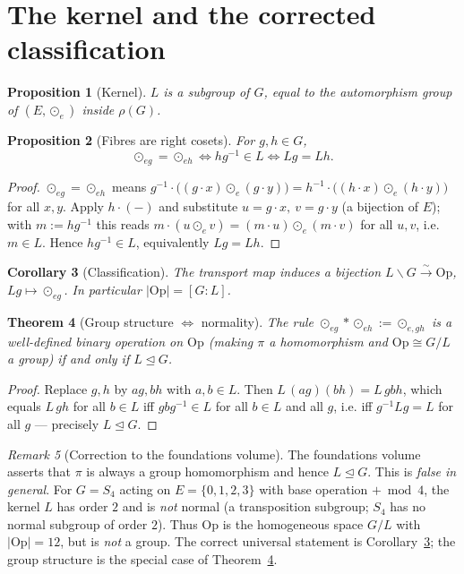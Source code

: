 \documentclass[11pt,a4paper]{article}
\newcommand{\Op}{\mathrm{Op}}
\theoremstyle{plain}
\newtheorem{theorem}{Theorem}
\newtheorem{proposition}[theorem]{Proposition}
\newtheorem{corollary}[theorem]{Corollary}
\theoremstyle{definition}
\theoremstyle{remark}
\newtheorem{remark}[theorem]{Remark}
\begin{document}
\section{The kernel and the corrected classification}

\begin{proposition}[Kernel]\label{prop:kernel}
$L$ is a subgroup of $G$, equal to the automorphism group of $(E,\odot_e)$
inside $\rho(G)$.
\end{proposition}

\begin{proposition}[Fibres are right cosets]\label{prop:fibres}
For $g,h\in G$,
\[
\odot_{eg} = \odot_{eh} \iff h g^{-1}\in L \iff Lg = Lh.
\]
\end{proposition}

\begin{proof}
$\odot_{eg}=\odot_{eh}$ means
$g^{-1}\!\cdot\!\bigl((g\cdot x)\odot_e(g\cdot y)\bigr)
 = h^{-1}\!\cdot\!\bigl((h\cdot x)\odot_e(h\cdot y)\bigr)$ for all $x,y$. Apply
$h\cdot(-)$ and substitute $u=g\cdot x,\ v=g\cdot y$ (a bijection of $E$); with
$m := hg^{-1}$ this reads $m\cdot(u\odot_e v) = (m\cdot u)\odot_e(m\cdot v)$ for
all $u,v$, i.e. $m\in L$. Hence $hg^{-1}\in L$, equivalently $Lg=Lh$.
\end{proof}

\begin{corollary}[Classification]\label{cor:classification}
The transport map induces a bijection $L\backslash G \xrightarrow{\ \sim\ }\Op$,
$Lg \mapsto \odot_{eg}$. In particular $|\Op| = [G:L]$.
\end{corollary}

\begin{theorem}[Group structure $\iff$ normality]\label{thm:group-iff-normal}
The rule $\odot_{eg}\ast\odot_{eh} := \odot_{e,gh}$ is a well-defined binary
operation on $\Op$ (making $\pi$ a homomorphism and $\Op\cong G/L$ a group) if
and only if $L \trianglelefteq G$.
\end{theorem}

\begin{proof}
Replace $g,h$ by $ag, bh$ with $a,b\in L$. Then
$L\,(ag)(bh) = L\,g b h$, which equals $L\,gh$ for all $b\in L$ iff
$g b g^{-1}\in L$ for all $b\in L$ and all $g$, i.e. iff $g^{-1}Lg = L$ for all
$g$ --- precisely $L\trianglelefteq G$.
\end{proof}

\begin{remark}[Correction to the foundations volume]\label{rem:correction}
The foundations volume asserts that $\pi$ is always a group homomorphism and
hence $L\trianglelefteq G$. This is \emph{false in general}. For
$G = S_4$ acting on $E=\{0,1,2,3\}$ with base operation $+\bmod 4$, the kernel
$L$ has order $2$ and is \emph{not} normal (a transposition subgroup; $S_4$ has
no normal subgroup of order $2$). Thus $\Op$ is the homogeneous space $G/L$ with
$|\Op| = 12$, but is \emph{not} a group. The correct universal statement is
Corollary~\ref{cor:classification}; the group structure is the special case
of Theorem~\ref{thm:group-iff-normal}.
\end{remark}
\end{document}
